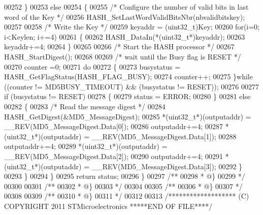 \begin{DoxyCode}
00252     \}
00253     \textcolor{keywordflow}{else}
00254     \{
00255       \textcolor{comment}{/* Configure the number of valid bits in last word of the Key */}
00256       HASH\_SetLastWordValidBitsNbr(nbvalidbitskey);
00257 
00258       \textcolor{comment}{/* Write the Key */}
00259       keyaddr = (uint32\_t)Key;
00260       \textcolor{keywordflow}{for}(i=0; i<Keylen; i+=4)
00261       \{
00262         HASH\_DataIn(*(uint32\_t*)keyaddr);
00263         keyaddr+=4;
00264       \}
00265 
00266        \textcolor{comment}{/* Start the HASH processor */}
00267        HASH\_StartDigest();
00268 
00269        \textcolor{comment}{/* wait until the Busy flag is RESET */}
00270        counter =0;
00271        \textcolor{keywordflow}{do}
00272        \{
00273           busystatus = HASH\_GetFlagStatus(HASH_FLAG_BUSY);
00274           counter++;
00275       \}\textcolor{keywordflow}{while} ((counter != MD5BUSY_TIMEOUT) && (busystatus != RESET));
00276 
00277       \textcolor{keywordflow}{if} (busystatus != RESET)
00278       \{
00279          status = ERROR;
00280       \}
00281       \textcolor{keywordflow}{else}
00282       \{
00283          \textcolor{comment}{/* Read the message digest */}
00284          HASH\_GetDigest(&MD5\_MessageDigest);
00285          *(uint32\_t*)(outputaddr)  = \_\_REV(MD5\_MessageDigest.Data[0]);
00286          outputaddr+=4;
00287          *(uint32\_t*)(outputaddr)  = \_\_REV(MD5\_MessageDigest.Data[1]);
00288          outputaddr+=4;
00289          *(uint32\_t*)(outputaddr)  = \_\_REV(MD5\_MessageDigest.Data[2]);
00290          outputaddr+=4;
00291          *(uint32\_t*)(outputaddr)  = \_\_REV(MD5\_MessageDigest.Data[3]);
00292       \}
00293     \}
00294   \}
00295   \textcolor{keywordflow}{return} status;
00296 \}
00297 \textcolor{comment}{/**}
00298 \textcolor{comment}{  * @\}}
00299 \textcolor{comment}{  */}
00300 
00301 \textcolor{comment}{/**}
00302 \textcolor{comment}{  * @\}}
00303 \textcolor{comment}{  */}
00304 
00305 \textcolor{comment}{/**}
00306 \textcolor{comment}{  * @\}}
00307 \textcolor{comment}{  */}
00308 
00309 \textcolor{comment}{/**}
00310 \textcolor{comment}{  * @\}}
00311 \textcolor{comment}{  */}
00312 
00313 \textcolor{comment}{/******************* (C) COPYRIGHT 2011 STMicroelectronics *****END OF FILE****/}
\end{DoxyCode}
